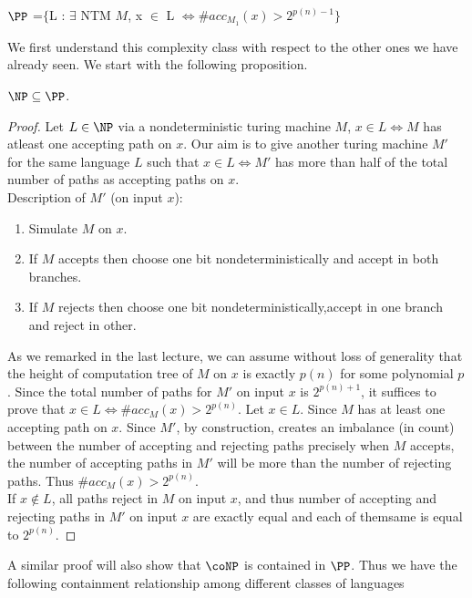 \begin{definition}
$\PP$ =$\{$L : $\exists$ NTM $M$, x $\in$ L $\iff \#acc_{M_1}(x) > 2^{p(n)-1} \}$
\end{definition}

We first understand this complexity class with respect to the other ones we have already seen. We start with the following proposition.

\begin{proposition}
\label{prop}
$\NP \subseteq \PP$.
\end{proposition}
\begin{proof}
Let $L \in \NP$  via a nondeterministic turing machine $M$,  $ x \in L \iff M$ has atleast one accepting path on $x$. 
Our aim is to give another turing machine $M'$ for the same language $L$ such that
$x \in L \iff M'$ has more than half of the total number of paths as accepting paths on $x$.\\
Description of $M'$ (on input $x$):
\begin{enumerate}
\item Simulate $M$ on $x$.
\item If $M$ accepts then choose one bit nondeterministically and accept in both branches.
\item If $M$ rejects then choose one bit nondeterministically,accept in one branch and reject in other.
\end{enumerate}

As we remarked in the last lecture, we can assume without loss of generality that the height of computation tree of $M$ on $x$ is exactly $p(n)$ for some polynomial $p$. Since the total number of paths for $M'$ on input $x$ is $2^{p(n)+1}$, it suffices to prove that $x \in L \iff \#acc_M(x) > 2^{p(n)}$.
Let $x \in L$. Since $M$ has at least one accepting path on $x$. Since $M'$, by construction, creates an imbalance (in count) between the number of accepting and rejecting paths precisely when $M$ accepts,  the number of accepting paths in $M'$ will be more than the number of rejecting paths. Thus $\#acc_M(x) > 2^{p(n)}$. \\
If  $x \not\in L$, all paths reject in $M$ on input $x$, and thus  number of accepting and rejecting
paths in $M'$ on input $x$ are exactly equal and each of themsame is equal to $2^{p(n)}$.
\end{proof}

A similar proof will also show that $\coNP$ is contained in
$\PP$. Thus we have the following containment relationship among
different classes of languages
 
